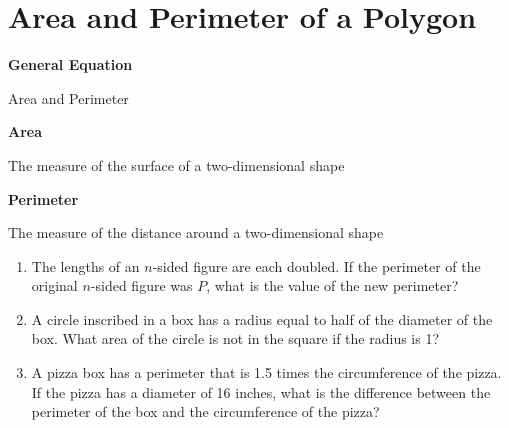 \section[Polygons]{Area and Perimeter of a Polygon}
\textbf{General Equation}

\bigskip
\begin{equationbox}{Area and Perimeter}
\setlength{\columnseprule}{0pt}
\begin{center}
\begin{multicols}{2}
\textbf{Area}

The measure of the surface of a two-dimensional shape

\columnbreak
\textbf{Perimeter}

The measure of the distance around a two-dimensional shape
\end{multicols}
\end{center}
\end{equationbox}

\bigskip
\begin{enumerate}[labelindent=*,style=multiline,leftmargin=*,label=\textbf{Example \arabic*:}]
\item The lengths of an $n$-sided figure are each doubled. If the perimeter of the original $n$-sided figure was $P$, what is the value of the new perimeter?

\vfill\item A circle inscribed in a box has a radius equal to half of the diameter of the box. What area of the circle is not in the square if the radius is 1?

\vfill\item A pizza box has a perimeter that is 1.5 times the circumference of the pizza. If the pizza has a diameter of 16 inches, what is the difference between the perimeter of the box and the circumference of the pizza?
\end{enumerate}

